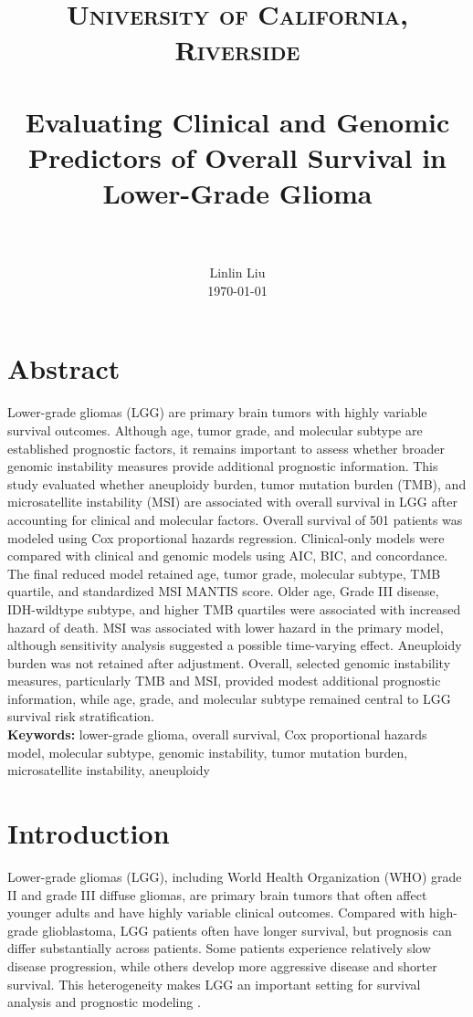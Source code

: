 \documentclass[paper=a4, fontsize=11pt]{scrartcl}
\title{\usefont{OT1}{bch}{b}{n}
		\normalfont \normalsize \textsc{University of California, Riverside} \\ [25pt]
		\horrule{0.5pt} \\[0.4cm]
		\huge Evaluating Clinical and Genomic Predictors of Overall Survival in Lower-Grade Glioma \\
		\horrule{2pt} \\[0.5cm]}
\author{
		\normalfont 								\normalsize
        Linlin Liu \\[-3pt]		\normalsize
        \today}
\date{}
\numberwithin{equation}{section}		%
\numberwithin{figure}{section}			%
\numberwithin{table}{section}				%
\begin{document}
\maketitle

\section{Abstract}

Lower-grade gliomas (LGG) are primary brain tumors with highly variable survival outcomes. Although age, tumor grade, and molecular subtype are established prognostic factors, it remains important to assess whether broader genomic instability measures provide additional prognostic information. This study evaluated whether aneuploidy burden, tumor mutation burden (TMB), and microsatellite instability (MSI) are associated with overall survival in LGG after accounting for clinical and molecular factors. Overall survival of 501 patients was modeled using Cox proportional hazards regression. Clinical-only models were compared with clinical and genomic models using AIC, BIC, and concordance. The final reduced model retained age, tumor grade, molecular subtype, TMB quartile, and standardized MSI MANTIS score. Older age, Grade III disease, IDH-wildtype subtype, and higher TMB quartiles were associated with increased hazard of death. MSI was associated with lower hazard in the primary model, although sensitivity analysis suggested a possible time-varying effect. Aneuploidy burden was not retained after adjustment. Overall, selected genomic instability measures, particularly TMB and MSI, provided modest additional prognostic information, while age, grade, and molecular subtype remained central to LGG survival risk stratification. \\

\noindent
\textbf{Keywords:} lower-grade glioma, overall survival, Cox proportional hazards model, molecular subtype, genomic instability, tumor mutation burden, microsatellite instability, aneuploidy

\section{Introduction}

Lower-grade gliomas (LGG), including World Health Organization (WHO) grade II and grade III diffuse gliomas, are primary brain tumors that often affect younger adults and have highly variable clinical outcomes. Compared with high-grade glioblastoma, LGG patients often have longer survival, but prognosis can differ substantially across patients. Some patients experience relatively slow disease progression, while others develop more aggressive disease and shorter survival. This heterogeneity makes LGG an important setting for survival analysis and prognostic modeling \cite{tcga2015}. \\
\end{document}
